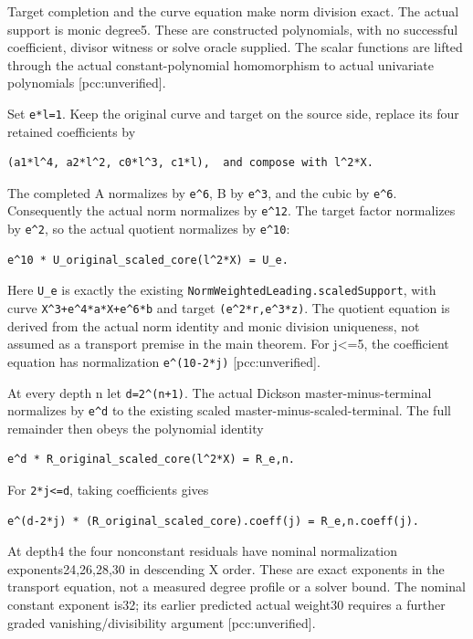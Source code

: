 \documentclass[
  10pt,
]{article}
\begin{document}
Target completion and the curve equation make norm division exact. The
actual support is monic degree5. These are constructed polynomials, with
no successful coefficient, divisor witness or solve oracle supplied. The
scalar functions are lifted through the actual constant-polynomial
homomorphism to actual univariate polynomials {[}pcc:unverified{]}.

Set \texttt{e*l=1}. Keep the original curve and target on the source
side, replace its four retained coefficients by

\begin{verbatim}
(a1*l^4, a2*l^2, c0*l^3, c1*l),  and compose with l^2*X.
\end{verbatim}

The completed A normalizes by \texttt{e\^{}6}, B by \texttt{e\^{}3}, and
the cubic by \texttt{e\^{}6}. Consequently the actual norm normalizes by
\texttt{e\^{}12}. The target factor normalizes by \texttt{e\^{}2}, so
the actual quotient normalizes by \texttt{e\^{}10}:

\begin{verbatim}
e^10 * U_original_scaled_core(l^2*X) = U_e.
\end{verbatim}

Here \texttt{U\_e} is exactly the existing
\texttt{NormWeightedLeading.scaledSupport}, with curve
\texttt{X\^{}3+e\^{}4*a*X+e\^{}6*b} and target
\texttt{(e\^{}2*r,e\^{}3*z)}. The quotient equation is derived from the
actual norm identity and monic division uniqueness, not assumed as a
transport premise in the main theorem. For j\textless=5, the coefficient
equation has normalization \texttt{e\^{}(10-2*j)} {[}pcc:unverified{]}.

At every depth n let \texttt{d=2\^{}(n+1)}. The actual Dickson
master-minus-terminal normalizes by \texttt{e\^{}d} to the existing
scaled master-minus-scaled-terminal. The full remainder then obeys the
polynomial identity

\begin{verbatim}
e^d * R_original_scaled_core(l^2*X) = R_e,n.
\end{verbatim}

For \texttt{2*j\textless{}=d}, taking coefficients gives

\begin{verbatim}
e^(d-2*j) * (R_original_scaled_core).coeff(j) = R_e,n.coeff(j).
\end{verbatim}

At depth4 the four nonconstant residuals have nominal normalization
exponents24,26,28,30 in descending X order. These are exact exponents in
the transport equation, not a measured degree profile or a solver bound.
The nominal constant exponent is32; its earlier predicted actual
weight30 requires a further graded vanishing/divisibility argument
{[}pcc:unverified{]}.
\end{document}
